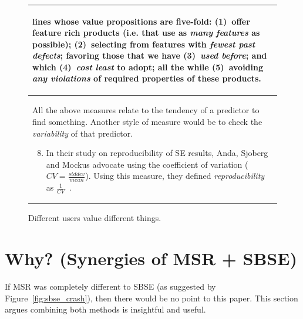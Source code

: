 \documentclass[sigconf,anonymous,review]{acmart}
\begin{document}
\begin{figure}[!t]
\begin{tabular}{p{.95\linewidth}}
\begin{enumerate}[leftmargin=0.4cm]
lines whose value propositions are five-fold:
(1)~offer feature rich products (i.e. that
use as {\em many features} as possible);
(2)~selecting from features with {\em fewest past defects};
favoring those that we have (3)~{\em used before}; and which
(4)~{\em cost
least} to adopt; all the while (5)~avoiding {\em any violations} of
required properties of these
products.
\end{enumerate}
\\ \hline
\rowcolor{gray!10}
All the above measures relate to the tendency of a predictor to find something. Another style
of measure would be to check the {\em variability} of that predictor.
\begin{enumerate}[leftmargin=0.4cm]
\setcounter{enumi}{7}
\item
In their study on reproducibility of SE results,
 Anda, Sjoberg and Mockus advocate using the coefficient of variation ($CV=\frac{stddev}{mean}$).
Using this measure, they defined {\em reproducibility} as $\frac{1}{CV}$~\cite{mockus09}.
\end{enumerate}\\\hline
\end{tabular}
\caption[Different users value different things.]{Different users value different things.
}\label{fig:goals}
\end{figure}


\section{  Why? (Synergies of MSR + SBSE)}


If MSR was completely different to SBSE (as suggested by Figure~\ref{fig:sbse_crash}), 
then there would be no point
to this paper. This section argues combining both methods is insightful and useful.

\end{document}
